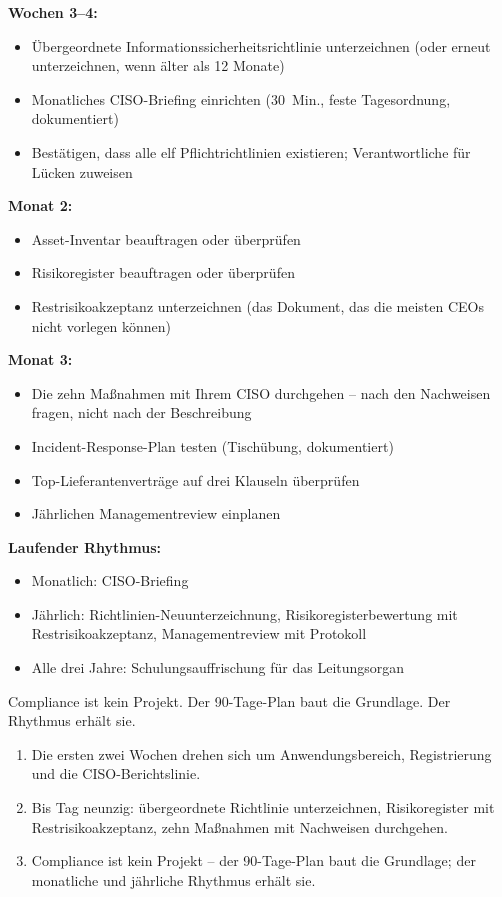 \documentclass[11pt,a4paper,twoside]{book}
\begin{document}
\textbf{Wochen 3--4:}
\begin{itemize}
  \item Übergeordnete Informationssicherheitsrichtlinie unterzeichnen (oder erneut unterzeichnen, wenn älter als 12 Monate)
  \item Monatliches CISO-Briefing einrichten (30~Min., feste Tagesordnung, dokumentiert)
  \item Bestätigen, dass alle elf Pflichtrichtlinien existieren; Verantwortliche für Lücken zuweisen
\end{itemize}

\textbf{Monat 2:}
\begin{itemize}
  \item Asset-Inventar beauftragen oder überprüfen
  \item Risikoregister beauftragen oder überprüfen
  \item Restrisikoakzeptanz unterzeichnen (das Dokument, das die meisten CEOs nicht vorlegen können)
\end{itemize}

\textbf{Monat 3:}
\begin{itemize}
  \item Die zehn Maßnahmen mit Ihrem CISO durchgehen -- nach den Nachweisen fragen, nicht nach der Beschreibung
  \item Incident-Response-Plan testen (Tischübung, dokumentiert)
  \item Top-Lieferantenverträge auf drei Klauseln überprüfen
  \item Jährlichen Managementreview einplanen
\end{itemize}

\textbf{Laufender Rhythmus:}
\begin{itemize}
  \item Monatlich: CISO-Briefing
  \item Jährlich: Richtlinien-Neuunterzeichnung, Risikoregisterbewertung mit Restrisikoakzeptanz, Managementreview mit Protokoll
  \item Alle drei Jahre: Schulungsauffrischung für das Leitungsorgan
\end{itemize}

Compliance ist kein Projekt. Der 90-Tage-Plan baut die Grundlage. Der Rhythmus erhält sie.

\begin{keytakeaways}
\begin{enumerate}
  \item Die ersten zwei Wochen drehen sich um Anwendungsbereich, Registrierung und die CISO-Berichtslinie.
  \item Bis Tag neunzig: übergeordnete Richtlinie unterzeichnen, Risikoregister mit Restrisikoakzeptanz, zehn Maßnahmen mit Nachweisen durchgehen.
  \item Compliance ist kein Projekt -- der 90-Tage-Plan baut die Grundlage; der monatliche und jährliche Rhythmus erhält sie.
\end{enumerate}
\end{keytakeaways}
\end{document}
